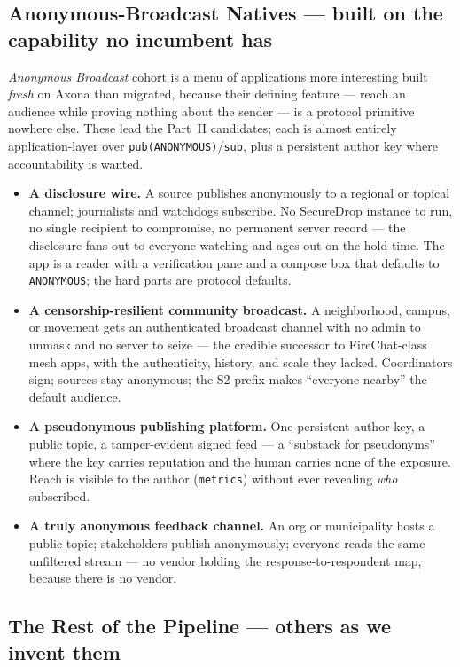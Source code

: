 \documentclass[nobib]{tufte-handout}
\begin{document}
\subsection{Anonymous-Broadcast Natives --- built on the capability no
incumbent has}

 \emph{Anonymous Broadcast} cohort is a menu of
applications more interesting built \emph{fresh} on Axona than migrated,
because their defining feature --- reach an audience while proving nothing
about the sender --- is a protocol primitive nowhere else. These lead the
Part~II candidates; each is almost entirely application-layer over
\texttt{pub(ANONYMOUS)}/\texttt{sub}, plus a persistent author key where
accountability is wanted.

\begin{itemize}
\item \textbf{A disclosure wire.} A source publishes anonymously to a
regional or topical channel; journalists and watchdogs subscribe. No
SecureDrop instance to run, no single recipient to compromise, no
permanent server record --- the disclosure fans out to everyone watching
and ages out on the hold-time. The app is a reader with a verification
pane and a compose box that defaults to \texttt{ANONYMOUS}; the hard parts
are protocol defaults.
\item \textbf{A censorship-resilient community broadcast.} A neighborhood,
campus, or movement gets an authenticated broadcast channel with no admin
to unmask and no server to seize --- the credible successor to
FireChat-class mesh apps, with the authenticity, history, and scale they
lacked. Coordinators sign; sources stay anonymous; the S2 prefix makes
``everyone nearby'' the default audience.
\item \textbf{A pseudonymous publishing platform.} One persistent author
key, a public topic, a tamper-evident signed feed --- a ``substack for
pseudonyms'' where the key carries reputation and the human carries none
of the exposure. Reach is visible to the author
(\texttt{metrics}) without ever revealing \emph{who} subscribed.
\item \textbf{A truly anonymous feedback channel.} An org or municipality
hosts a public topic; stakeholders publish anonymously; everyone reads the
same unfiltered stream --- no vendor holding the response-to-respondent
map, because there is no vendor.
\end{itemize}

\subsection{The Rest of the Pipeline --- others as we invent them}
\end{document}
